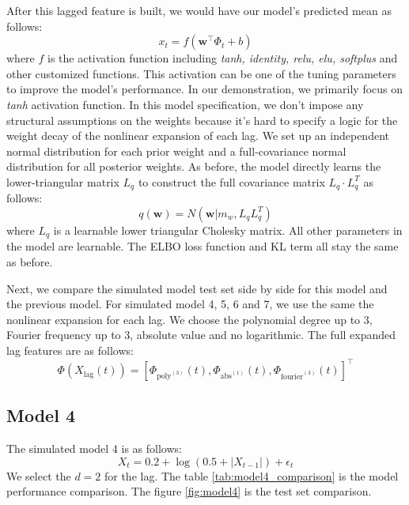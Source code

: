 \documentclass{article}
\begin{document}
After this lagged feature is built, we would have our model's predicted mean as follows:
$$
x_t=f\left(\mathbf{w}^{\top} \Phi_t+b\right)
$$ where $f$ is the activation function including \textit{tanh, identity, relu, elu, softplus} and other customized functions. This activation can be one of the tuning parameters to improve the model's performance. In our demonstration, we primarily focus on \textit{tanh} activation function. In this model specification, we don't impose any structural assumptions on the weights because it's hard to specify a logic for the weight decay of the nonlinear expansion of each lag. We set up an independent normal distribution for each prior weight and a full-covariance normal distribution for all posterior weights. As before, the model directly learns the lower-triangular matrix $L_q$ to construct the full covariance matrix $L_q\cdot L_q^T$ as follows:
$$
q(\textbf{w}) = N(\textbf{w}| m_w, L_qL_q^T)
$$ where $L_q$ is a learnable lower triangular Cholesky matrix. All other parameters in the model are learnable. The ELBO loss function and KL term all stay the same as before. 

Next, we compare the simulated model test set side by side for this model and the previous model. For simulated model 4, 5, 6 and 7, we use the same the nonlinear expansion for each lag. We choose the polynomial degree up to 3, Fourier frequency up to 3, absolute value and no logarithmic. The full expanded lag features are as follows:
$$\Phi\left(X_{\mathrm{lag}}(t)\right)=\left[\Phi_{\mathrm{poly}^{(3)}}(t), \Phi_{\mathrm{abs}^{(1)}}(t), \Phi_{\text{fourier}^{(3)}}(t)\right]^{\top}$$

\subsection{Model 4}
The simulated model 4 is as follows:
$$X_t=0.2+\log \left(0.5+\left|X_{t-1}\right|\right)+\epsilon_t$$
We select the $d=2$ for the lag. The table \ref{tab:model4_comparison} is the model performance comparison. The figure \ref{fig:model4} is the test set comparison. 
\end{document}
